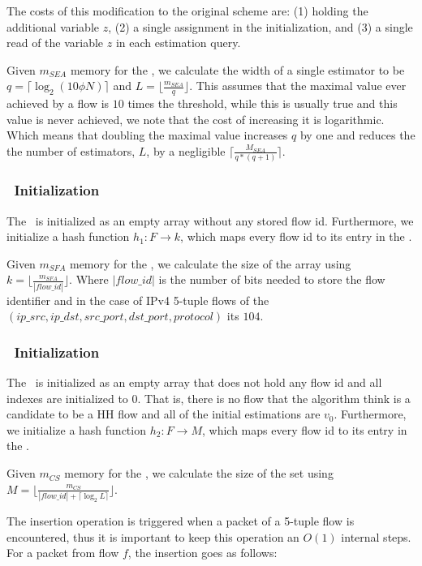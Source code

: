 The costs of this modification to the original scheme are: (1) holding the additional variable $z$, (2) a single assignment in the initialization, and (3) a single read of the variable $z$ in each estimation query.

Given $m_{SEA}$ memory for the \sea, we calculate the width of a single estimator to be $q=\lceil \log_{2}(10 \phi N)\rceil$ and $L=\lfloor \frac{m_{SEA}}{q} \rfloor$. This assumes that the maximal value ever achieved by a flow is $10$ times the threshold, while this is usually true and this value is never achieved, we note that the cost of increasing it is logarithmic. Which means that doubling the maximal value increases $q$ by one and reduces the the number of estimators, $L$, by a negligible $\lceil\frac{M_{SEA}}{q*(q+1)}\rceil$.


\subsubsection{\sfa\ Initialization}
The \sfa\ is initialized as an empty array without any stored flow id. Furthermore, we initialize a hash function $h_1:F\rightarrow k$, which maps every flow id to its entry in the \sfa.

Given $m_{SFA}$ memory for the \sfa, we calculate the size of the array using $k=\lfloor \frac{m_{SFA}}{|flow\_id|} \rfloor$. Where $|flow\_id|$ is the number of bits needed to store the flow identifier and in the case of IPv4 5-tuple flows of the $(ip\_src, ip\_dst, src\_port, dst\_port, protocol)$ its $104$.

\subsubsection{\cs\ Initialization}
The \cs\ is initialized as an empty array that does not hold any flow id and all indexes are initialized to 0. That is, there is no flow that the algorithm think is a candidate to be a HH flow and all of the initial estimations are $v_0$. Furthermore, we initialize a hash function $h_2:F\rightarrow M$, which maps every flow id to its entry in the \cs.

Given $m_{CS}$ memory for the \cs, we calculate the size of the set using $M=\lfloor \frac{m_{CS}}{|flow\_id| + \lceil \log_2{L} \rceil} \rfloor$.

The insertion operation is triggered when a packet of a 5-tuple flow is encountered, thus it is important to keep this operation an $O(1)$ internal steps. For a packet from flow $f$, the insertion goes as follows:

